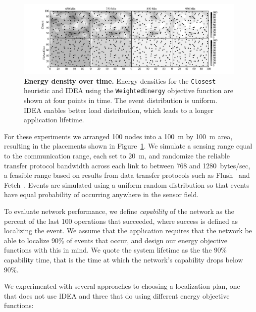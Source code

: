 \begin{figure}[t]
\begin{center}
\includegraphics[width=\hsize]{./5-idea/figs/localizationdensityvtime.pdf}
\end{center}

\caption{\textbf{Energy density over time.} Energy densities for the
\texttt{Closest} heuristic and IDEA using the \texttt{WeightedEnergy}
objective function are shown at four points in time. The event distribution
is uniform. IDEA enables better load distribution, which leads to a longer
application lifetime.}

\label{idea-fig-localizationdensityvtime}
\end{figure}

For these experiments we arranged 100 nodes into a 100~m by 100~m area,
resulting in the placements shown in
Figure~\ref{idea-fig-localizationdensityvtime}. We simulate a sensing range
equal to the communication range, each set to 20~m, and randomize the
reliable transfer protocol bandwidth across each link to between 768 and
1280~bytes/sec, a feasible range based on results from data transfer
protocols such as Flush~\cite{flush-sensys07} and
Fetch~\cite{volcano-osdi06}. Events are simulated using a uniform random
distribution so that events have equal probability of occurring anywhere in
the sensor field.

To evaluate network performance, we define \textit{capability} of the network
as the percent of the last 100 operations that succeeded, where success is
defined as localizing the event. We assume that the application requires that
the network be able to localize 90\% of events that occur, and design our
energy objective functions with this in mind. We quote the system lifetime as
the the 90\% capability time, that is the time at which the network's
capability drops below 90\%.

We experimented with several approaches to choosing a localization plan, one
that does not use IDEA and three that do using different energy objective
functions:

